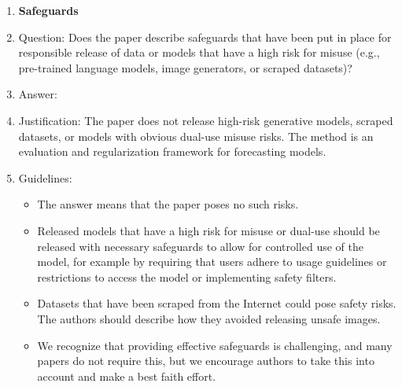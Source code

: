 \begin{enumerate}
\item {\bf Safeguards}
    \item[] Question: Does the paper describe safeguards that have been put in place for responsible release of data or models that have a high risk for misuse (e.g., pre-trained language models, image generators, or scraped datasets)?
    \item[] Answer: \answerNA{}
    \item[] Justification: The paper does not release high-risk generative models, scraped datasets, or models with obvious dual-use misuse risks. The method is an evaluation and regularization framework for forecasting models.
    \item[] Guidelines:
    \begin{itemize}
        \item The answer \answerNA{} means that the paper poses no such risks.
        \item Released models that have a high risk for misuse or dual-use should be released with necessary safeguards to allow for controlled use of the model, for example by requiring that users adhere to usage guidelines or restrictions to access the model or implementing safety filters. 
        \item Datasets that have been scraped from the Internet could pose safety risks. The authors should describe how they avoided releasing unsafe images.
        \item We recognize that providing effective safeguards is challenging, and many papers do not require this, but we encourage authors to take this into account and make a best faith effort.
    \end{itemize}


\end{enumerate}
